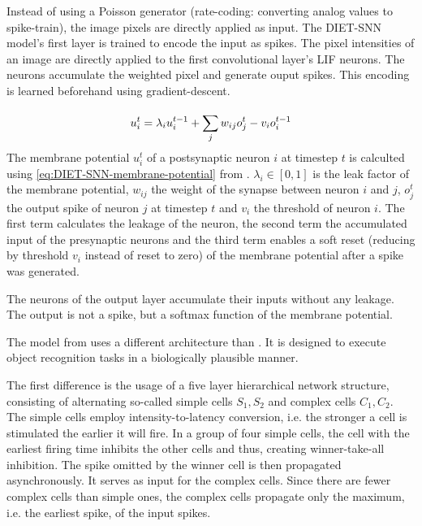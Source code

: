 Instead of using a Poisson generator (rate-coding: converting analog values to spike-train), the image pixels are directly applied as input.
The \ac{DIET}-\ac{SNN} model's first layer is trained to encode the input as spikes.
The pixel intensities of an image are directly applied to the first convolutional layer's \ac{LIF} neurons.
The neurons accumulate the weighted pixel and generate ouput spikes.
This encoding is learned beforehand using gradient-descent.

\begin{equation}
    \centering
    \label{eq:DIET-SNN-membrane-potential}
    u_i^t = \lambda_i u_i^{t-1} + \sum_{j}^{}w_{ij}o_j^t-v_{i}o_i^{t-1}
\end{equation}
%
The membrane potential $u_i^t$ of a postsynaptic neuron $i$ at timestep $t$ 
is calculted using \autoref{eq:DIET-SNN-membrane-potential} from \cite{DIET_SNN}. 
$\lambda_i \in [0,1]$ is the leak factor of the membrane potential, 
$w_{ij}$ the weight of the synapse between neuron $i$ and $j$, 
$o_j^t$ the output spike of neuron $j$ at timestep $t$ and 
$v_i$ the threshold of neuron $i$.
The first term calculates the leakage of the neuron,
the second term the accumulated input of the presynaptic neurons and
the third term enables a soft reset (reducing by threshold $v_i$ instead of reset to zero) of the membrane potential after a spike was generated.

The neurons of the output layer accumulate their inputs without any leakage.
The output is not a spike, but a softmax function of the membrane potential.

The model from \cite{multi_scale_STDP} uses a different architecture than \cite{SNN}.
It is designed to execute object recognition tasks in a biologically plausible manner.

The first difference is the usage of a five layer hierarchical network structure, consisting of alternating so-called simple cells $S_1, S_2$ and complex cells $C_1, C_2$.
The simple cells employ intensity-to-latency conversion, i.e. the stronger a cell is stimulated the earlier it will fire.
In a group of four simple cells, the cell with the earliest firing time inhibits the other cells and thus, creating winner-take-all inhibition.
The spike omitted by the winner cell is then propagated asynchronously.
It serves as input for the complex cells.
Since there are fewer complex cells than simple ones, the complex cells propagate only the maximum, i.e. the earliest spike, of the input spikes.

